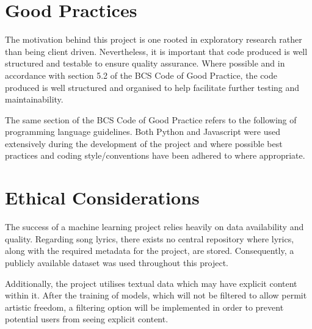 \section{Good Practices}
The motivation behind this project is one rooted in exploratory research rather than being client driven. Nevertheless, it is important that code produced is well structured and testable to ensure quality assurance. Where possible and in accordance with section 5.2 of the BCS Code of Good Practice, the code produced is well structured and organised to help facilitate further testing and maintainability. 

\noindent
\newline
The same section of the BCS Code of Good Practice refers to the following of programming language guidelines. Both Python and Javascript were used extensively during the development of the project and where possible best practices and coding style/conventions have been adhered to where appropriate. 

\section{Ethical Considerations}
The success of a machine learning project relies heavily on data availability and quality. Regarding song lyrics, there exists no central repository where lyrics, along with the required metadata for the project, are stored. Consequently, a publicly available dataset was used throughout this project.   

\noindent
\newline
Additionally, the project utilises textual data which may have explicit content within it. After the training of models, which will not be filtered to allow permit artistic freedom, a filtering option will be implemented in order to prevent potential users from seeing explicit content.